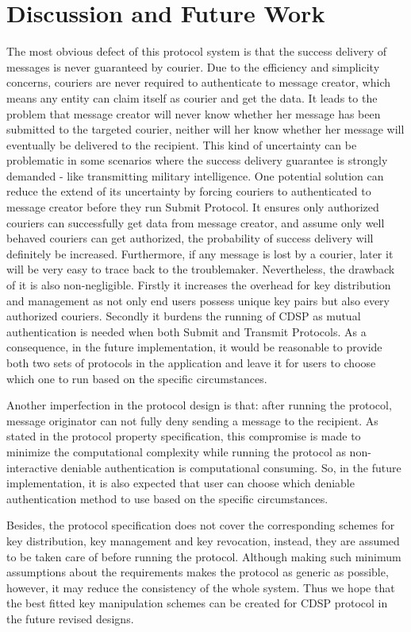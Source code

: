 \section{Discussion and Future Work}
The most obvious defect of this protocol system is that the success delivery of messages is never guaranteed by courier. Due to the efficiency and simplicity concerns, couriers are never required to authenticate to message creator, which means any entity can claim itself as courier and get the data. It leads to the problem that message creator will never know whether her message has been submitted to the targeted courier, neither will her know whether her message will eventually be delivered to the recipient. This kind of uncertainty can be problematic in some scenarios where the success delivery guarantee is strongly demanded - like transmitting military intelligence. One potential solution can reduce the extend of its uncertainty by forcing couriers to authenticated to message creator before they run Submit Protocol. It ensures only authorized couriers can successfully get data from message creator, and assume only well behaved couriers can get authorized, the probability of success delivery will definitely be increased. Furthermore, if any message is lost by a courier, later it will be very easy to trace back to the troublemaker. Nevertheless, the drawback of it is also non-negligible. Firstly it increases the overhead for key distribution and management as not only end users possess unique key pairs but also every authorized couriers. Secondly it burdens the running of CDSP as mutual authentication is needed when both Submit and Transmit Protocols. As a consequence, in the future implementation, it would be reasonable to provide both two sets of protocols in the application and leave it for users to choose which one to run based on the specific circumstances.

Another imperfection in the protocol design is that: after running the protocol, message originator can not fully deny sending a message to the recipient. As stated in the protocol property specification, this compromise is made to minimize the computational complexity while running the protocol as non-interactive deniable authentication is computational consuming. So, in the future implementation, it is also expected that user can choose which deniable authentication method to use based on the specific circumstances.

Besides, the protocol specification does not cover the corresponding schemes for key distribution, key management and key revocation, instead, they are assumed to be taken care of before running the protocol. Although making such minimum assumptions about the requirements makes the protocol as generic as possible, however, it may reduce the consistency of the whole system. Thus we hope that the best fitted key manipulation schemes can be created for CDSP protocol in the future revised designs.

